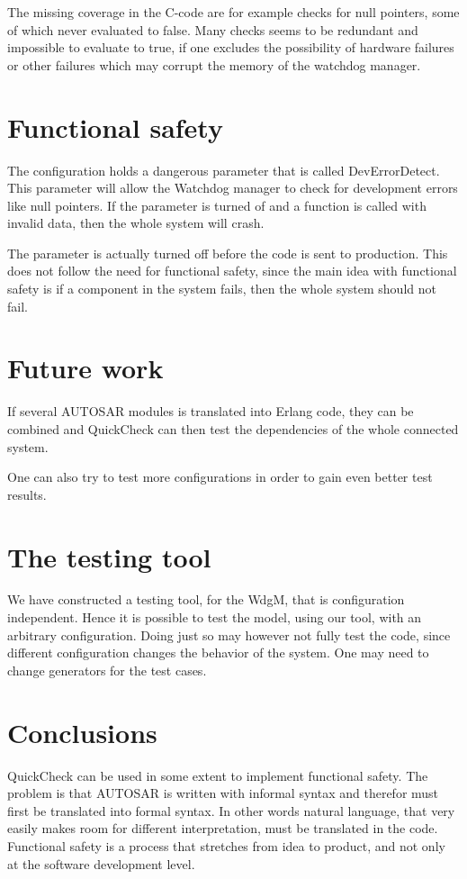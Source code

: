 \documentclass[a4paper]{article}
\begin{document}
The missing coverage in the C-code are for example checks for null
pointers, some of which never evaluated to false. Many checks seems to be
redundant and impossible to evaluate to true, if one excludes the possibility
of hardware failures or other failures which may corrupt the memory of the
watchdog manager.

\section{Functional safety}
The configuration holds a dangerous parameter that is called
DevErrorDetect. This parameter will allow the Watchdog manager to
check for development errors like null pointers. If the parameter is
turned of and a function is called with invalid data, then the whole
system will crash.

The parameter is actually turned off before the code is sent to
production. This does not follow the need for functional safety, since
the main idea with functional safety is if a component in the system
fails, then the whole system should not fail.

\section{Future work}
If several AUTOSAR modules is translated into Erlang code, they can be
combined and QuickCheck can then test the dependencies of the whole
connected system.

One can also try to test more configurations in order to gain even
better test results.

\section{The testing tool}
We have constructed a testing tool, for the WdgM, that is configuration
independent. Hence it is possible to test the model, using our tool, with an
arbitrary configuration. Doing just so may however not fully test the code,
since different configuration changes the behavior of the system. One may need
to change generators for the test cases.


\section{Conclusions}
QuickCheck can be used in some extent to implement functional
safety. The problem is that AUTOSAR is written with informal syntax
and therefor must first be translated into formal syntax. In other words
natural language, that very easily makes room for different interpretation,
must be translated in the code.
Functional safety is a process that stretches from idea to product,
and not only at the software development level.
\end{document}
